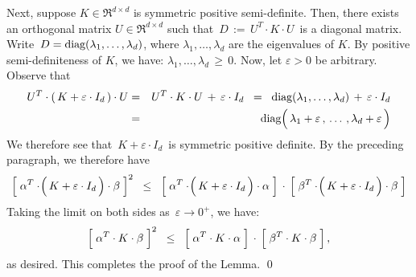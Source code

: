 Next, suppose $K \in \Re^{d \times d}$ is symmetric positive semi-definite.
Then, there exists an orthogonal matrix $U \in \Re^{d \times d}$ such that
\,$D \, := \, U^{T} \cdot K \cdot U$\, is a diagonal matrix.
Write \,$D = \textnormal{diag}(\lambda_{1},\ldots,\lambda_{d})$,
where $\lambda_{1},\ldots,\lambda_{d}$ are the eigenvalues of $K$.
By positive semi-definiteness of $K$, we have: $\lambda_{1}, \ldots, \lambda_{d} \,\geq\, 0$.
Now, let $\varepsilon > 0$ be arbitrary.
Observe that
\begin{eqnarray*}
U^{T}\cdot(\,K + \varepsilon \cdot I_{d}\,) \cdot U
& = &
	U^{T} \cdot K \cdot U \, + \, \varepsilon \cdot I_{d}
\;\; = \;\;
	\diag(\lambda_{1},\ldots,\lambda_{d}) \, + \, \varepsilon \cdot I_{d}
\\
& = &
	\diag\!\left(\,\lambda_{1} \overset{{\color{white}.}}{+} \varepsilon\,,\,\ldots\,,\lambda_{d} + \varepsilon\,\right)
\end{eqnarray*}
We therefore see that \,$K + \varepsilon \cdot I_{d}$\, is symmetric positive definite.
By the preceding paragraph, we therefore have
\begin{equation*}
\left[\; \alpha^{T}\cdot\!\left(\,K \overset{{\color{white}.}}{+} \varepsilon \cdot I_{d}\,\right) \cdot \beta \;\right]^{2}
\;\; \leq \;\;
	\left[\; \alpha^{T}\cdot\!\left(\,K \overset{{\color{white}.}}{+} \varepsilon \cdot I_{d}\,\right) \cdot \alpha \;\right]
	\, \cdot \,
	\left[\; \beta^{T}\cdot\!\left(\,K \overset{{\color{white}.}}{+} \varepsilon \cdot I_{d}\,\right) \cdot \beta \;\right]
\end{equation*}
Taking the limit on both sides as \,$\varepsilon \longrightarrow 0^{+}$, we have:
\begin{equation*}
\left[\;\alpha^{T}\cdot\overset{{\color{white}.}}{K} \cdot\beta\;\right]^{2}
\;\; \leq \;\;
	\left[\;\alpha^{T}\cdot\overset{{\color{white}.}}{K}\cdot\alpha\;\right]
	\, \cdot \,
	\left[\;\beta^{T}\cdot\overset{{\color{white}.}}{K}\cdot\beta\;\right],
\end{equation*}
as desired. This completes the proof of the Lemma.
\qed


\renewcommand{\theenumi}{\roman{enumi}}
\renewcommand{\labelenumi}{\textnormal{(\theenumi)}$\;\;$}

